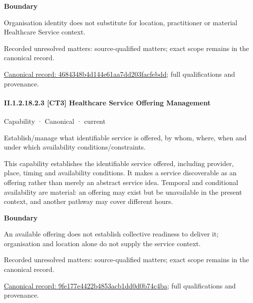 \textbf{Boundary}



Organisation identity does not substitute for location, practitioner or material Healthcare Service context.


{\small Recorded unresolved matters: source-qualified matters; exact scope remains in the canonical record.}\par
{\footnotesize \href{../../../../continuum/strategy/capability/4684348b4d144e61aa7dd203facfebdd.md}{Canonical record: 4684348b4d144e61aa7dd203facfebdd}; full qualifications and provenance.}\par
\paragraph*{II.1.2.18.2.3 [CT3] Healthcare Service Offering Management}
\label{navigation:II.1.2.18.2.3}

\label{element:9fe177e4422b4853acb1dd0d0b74c4ba}
{\small Capability · Canonical · current}\par

Establish/manage what identifiable service is offered, by whom, where, when and under which availability conditions/constraints.



This capability establishes the identifiable service offered, including provider, place, timing and availability conditions. It makes a service discoverable as an offering rather than merely an abstract service idea. Temporal and conditional availability are material: an offering may exist but be unavailable in the present context, and another pathway may cover different hours.



\textbf{Boundary}



An available offering does not establish collective readiness to deliver it; organisation and location alone do not supply the service context.


{\small Recorded unresolved matters: source-qualified matters; exact scope remains in the canonical record.}\par
{\footnotesize \href{../../../../continuum/strategy/capability/9fe177e4422b4853acb1dd0d0b74c4ba.md}{Canonical record: 9fe177e4422b4853acb1dd0d0b74c4ba}; full qualifications and provenance.}\par
